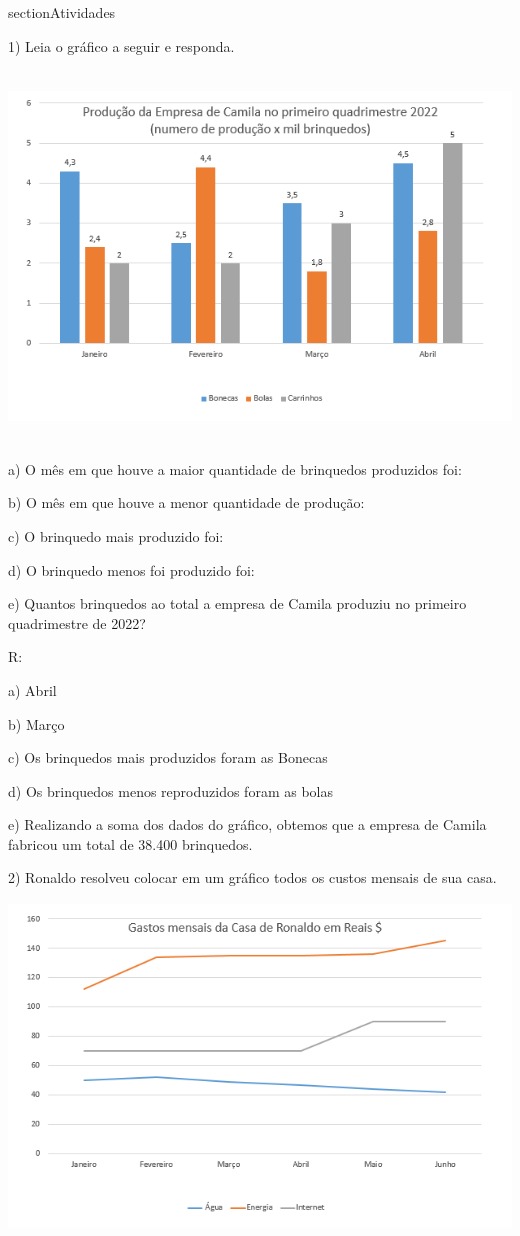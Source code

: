 section{Atividades}

1) Leia o gráfico a seguir e responda.

\includegraphics[width=5.90625in,height=3.86458in]{./imgSAEB_8_MAT/media/image39.png}

a) O mês em que houve a maior quantidade de brinquedos produzidos foi:

b) O mês em que houve a menor quantidade de produção:

c) O brinquedo mais produzido foi:

d) O brinquedo menos foi produzido foi:

e) Quantos brinquedos ao total a empresa de Camila produziu no primeiro
quadrimestre de 2022?

R:

a) Abril

b) Março

c) Os brinquedos mais produzidos foram as Bonecas

d) Os brinquedos menos reproduzidos foram as bolas

e) Realizando a soma dos dados do gráfico, obtemos que a empresa de
Camila fabricou um total de 38.400 brinquedos.

2) Ronaldo resolveu colocar em um gráfico todos os custos mensais de sua
casa.

\includegraphics[width=5.30833in,height=3.41384in]{./imgSAEB_8_MAT/media/image40.png}

